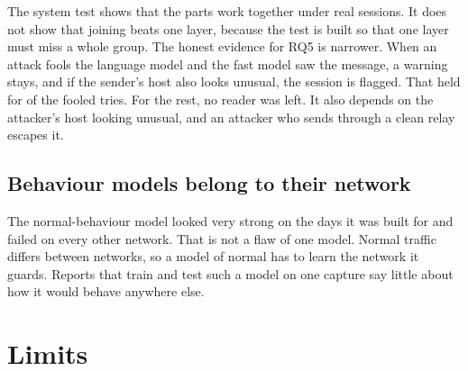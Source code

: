 The system test shows that the parts work together under real sessions. It does not show that joining beats one layer, because the test is built so that one layer must miss a whole group. The honest evidence for RQ5 is narrower. When an attack fools the language model and the fast model saw the message, a warning stays, and if the sender's host also looks unusual, the session is flagged. That held for \injectionSaved{} of the \injectionFooledCount{} fooled tries. For the rest, no reader was left. It also depends on the attacker's host looking unusual, and an attacker who sends through a clean relay escapes it.

\subsection{Behaviour models belong to their network}

The normal-behaviour model looked very strong on the days it was built for and failed on every other network. That is not a flaw of one model. Normal traffic differs between networks, so a model of normal has to learn the network it guards. Reports that train and test such a model on one capture say little about how it would behave anywhere else.

\section{Limits}

